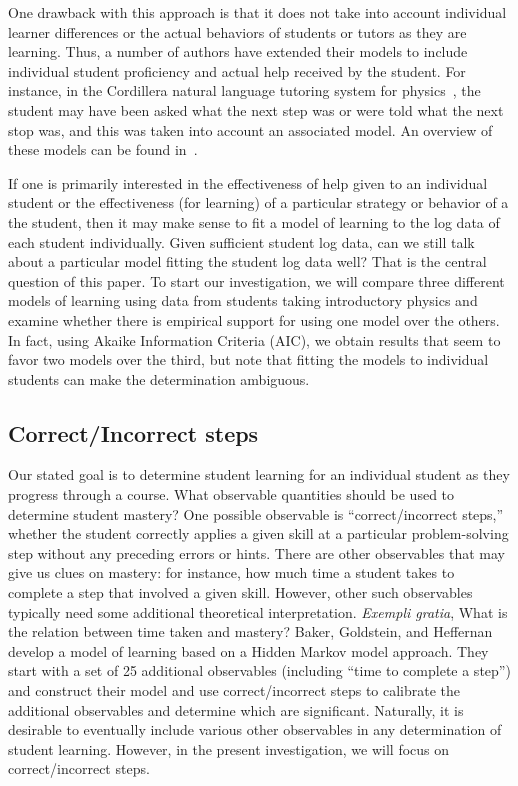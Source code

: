 \documentclass{edm_template}
\begin{document}
One drawback with this approach is that it does not take into account
individual learner differences or the actual behaviors of students or
tutors as they are learning.  Thus, a number of authors have extended
their models to include individual student proficiency and actual help
received by the student.  For instance, in the Cordillera natural
language tutoring system for physics~\cite{vanlehn_developing_2007},
the student may have been asked what the next step was or were told
what the next stop was, and this was taken into account an associated
model.  An overview of these models can be found 
in~\cite{chi_instructional_2011}.

If one is primarily interested in the effectiveness of help given to
an individual student or the effectiveness (for learning) of a particular
strategy or behavior of a the student, then it may make sense
to fit a model of learning to the log data of each student individually.
Given sufficient student log data, can we still talk about a particular
model fitting the student log data well?  That is the central question
of this paper.
To start our investigation, we will compare three different models of
learning using data from students taking introductory physics and examine
whether there is empirical support for using one model over the
others.  In fact, using Akaike Information Criteria (AIC), we obtain
results that seem to favor two models over the third, but note
that fitting the models to individual students can make the determination ambiguous.


\subsection{Correct/Incorrect steps}

Our stated goal is to determine student learning for an individual
student as they progress through a course.  What observable quantities
should be used to determine student mastery?  One possible observable
is ``correct/incorrect steps,'' whether the student correctly applies
a given skill at a particular problem-solving step without any
preceding errors or hints.  There are other observables that may give
us clues on mastery: for instance, how much time a student takes to
complete a step that involved a given skill.  However, other such
observables typically need some additional theoretical
interpretation. {\em Exempli gratia}, What is the relation between
time taken and mastery?  Baker, Goldstein, and
Heffernan~\citeyear{baker_detecting_2011} develop a model of learning
based on a Hidden Markov model approach.  They start with a set of
25 additional observables (including ``time to complete a step'') and
construct their model and use correct/incorrect steps
to calibrate the additional observables and determine which are
significant.  Naturally, it is
desirable to eventually include various other observables in any
determination of student learning.  However, in the present investigation,
we will focus on correct/incorrect steps.
\end{document}
